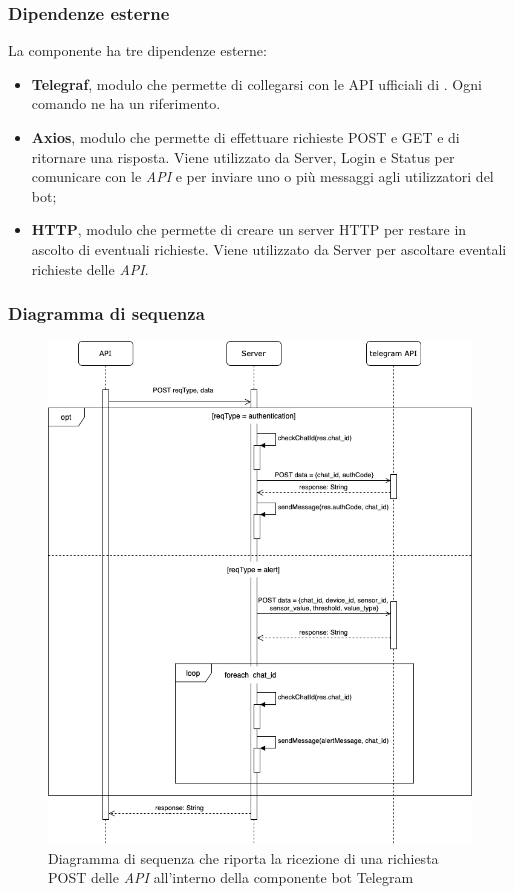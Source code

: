 \subsubsection{Dipendenze esterne}	
	La componente ha tre dipendenze esterne:
	\begin{itemize}
		\item \textbf{Telegraf}, modulo che permette di collegarsi con le API ufficiali di . Ogni comando ne ha un riferimento. 
		\item \textbf{Axios}, modulo che permette di effettuare richieste POST e GET e di ritornare una risposta. Viene utilizzato da Server, Login e Status per comunicare con le \textit{API} e per inviare uno o più messaggi agli utilizzatori del bot;
		\item \textbf{HTTP}, modulo che permette di creare un server HTTP per restare in ascolto di eventuali richieste. Viene utilizzato da Server per ascoltare eventali richieste delle \textit{API}.    
	\end{itemize}
\subsubsection{Diagramma di sequenza}%
	\begin{figure}[H]
		\centering
		\includegraphics[scale=0.500]{res/images/BOTTELEGRAM/TelegramRichiestaPOST.png}
		\caption{Diagramma di sequenza che riporta la ricezione di una richiesta POST delle \textit{API} all'interno della componente bot Telegram}
		\label{Diagramma 20}
	\end{figure}

